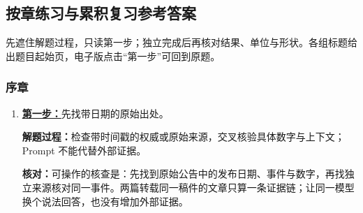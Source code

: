 \subsection{按章练习与累积复习参考答案}
\label{app:answers}
先遮住解题过程，只读第一步；独立完成后再核对结果、单位与形状。各组标题给出题目起始页，电子版点击“第一步”可回到原题。
\subsubsection*{序章}
\begin{enumerate}[label={},leftmargin=4.8em,itemsep=4pt]
\item[\textbf{C-001.}] \leavevmode{}\label{solution:C-001}\label{solution:verify-generated-news}\hyperref[exercise:verify-generated-news]{\textbf{第一步：}}先找带日期的原始出处。\par\nobreak\textbf{解题过程：}检查带时间戳的权威或原始来源，交叉核验具体数字与上下文；Prompt 不能代替外部证据。\par\textbf{核对：}可操作的核查是：先找到原始公告中的发布日期、事件与数字，再找独立来源核对同一事件。两篇转载同一稿件的文章只算一条证据链；让同一模型换个说法回答，也没有增加外部证据。
\end{enumerate}
